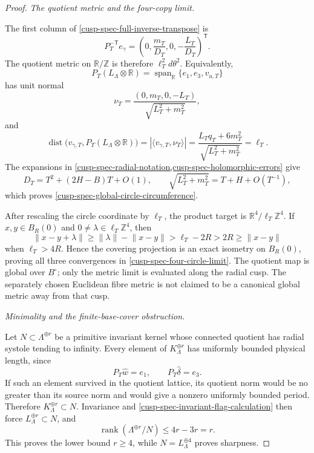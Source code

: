 \begin{proof}
\medskip\noindent\emph{The quotient metric and the four-copy limit.}\par
The first column of
\cref{cusp-spec-full-inverse-transpose} is
\begin{equation}
 P_T^{-\mathsf T}e_\gamma
 =\left(0,\frac{m_T}{D_T},0,-\frac{L_T}{D_T}\right)^{\mathsf T}.
 \label{cusp-spec-circle-dual-vector}
\end{equation}
The quotient metric on \(\mathbb R/\mathbb Z\) is therefore
\(\ell_T^2d\theta^2\).  Equivalently,
\[
 P_T(L_\Lambda\otimes\mathbb R)
 =\operatorname{span}_{\mathbb R}\{e_1,e_3,v_{u,T}\}
\]
has unit normal
\[
 \nu_T=\frac{(0,m_T,0,-L_T)}{\sqrt{L_T^2+m_T^2}},
\]
and
\[
 \operatorname{dist}
 \bigl(v_{\gamma,T},P_T(L_\Lambda\otimes\mathbb R)\bigr)
 =\left|\langle v_{\gamma,T},\nu_T\rangle\right|
 =\frac{L_Tq_T+6m_T^2}{\sqrt{L_T^2+m_T^2}}
 =\ell_T.
\]
The expansions in
\cref{cusp-spec-radial-notation,cusp-spec-holomorphic-errors} give
\[
 D_T=T^2+(2H-B)T+O(1),\qquad
 \sqrt{L_T^2+m_T^2}=T+H+O(T^{-1}),
\]
which proves \cref{cusp-spec-global-circle-circumference}.

After rescaling the circle coordinate by \(\ell_T\), the product target is
\(\mathbb R^4/\ell_T\mathbb Z^4\).  If
\(x,y\in B_R(0)\) and \(0\ne\lambda\in\ell_T\mathbb Z^4\), then
\[
 \lVert x-y+\lambda\rVert
 \ge\lVert\lambda\rVert-\lVert x-y\rVert
 >\ell_T-2R>2R\ge\lVert x-y\rVert
\]
when \(\ell_T>4R\).  Hence the covering projection is an exact isometry
on \(B_R(0)\), proving all three convergences in
\cref{cusp-spec-four-circle-limit}.  The quotient map is global over
\(B^\circ\); only the metric limit is evaluated along the radial cusp.
The separately chosen Euclidean fibre metric is not claimed to be a
canonical global metric away from that cusp.

\medskip\noindent\emph{Minimality and the finite-base-cover obstruction.}\par
Let \(N\subset\Lambda^{\oplus r}\) be a primitive invariant kernel whose
connected quotient has radial systole tending to infinity.  Every element
of \(K_\Lambda^{\oplus r}\) has uniformly bounded physical length, since
\[
 P_T\widehat w=e_1,\qquad P_T\widehat\delta=e_3.
\]
If such an element survived in the quotient lattice, its quotient norm
would be no greater than its source norm and would give a nonzero uniformly
bounded period.  Therefore \(K_\Lambda^{\oplus r}\subset N\).
Invariance and
\cref{cusp-spec-invariant-flag-calculation} then force
\(L_\Lambda^{\oplus r}\subset N\), and
\[
 \operatorname{rank}(\Lambda^{\oplus r}/N)\le4r-3r=r.
\]
This proves the lower bound \(r\ge4\), while
\(N=L_\Lambda^{\oplus4}\) proves sharpness.


\end{proof}
